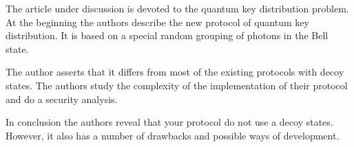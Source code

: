 The article under discussion is devoted to the quantum key distribution problem. At the beginning the authors describe the new protocol of quantum key distribution. It is based on a special random grouping of photons in the Bell state.

The author asserts that it differs from most of the existing protocols with decoy states. The authors study the complexity of the implementation of their protocol and do a security analysis.

In conclusion the authors reveal that your protocol do not use a decoy states. However, it also has a number of drawbacks and possible ways of development.


\subsection{\dic}
